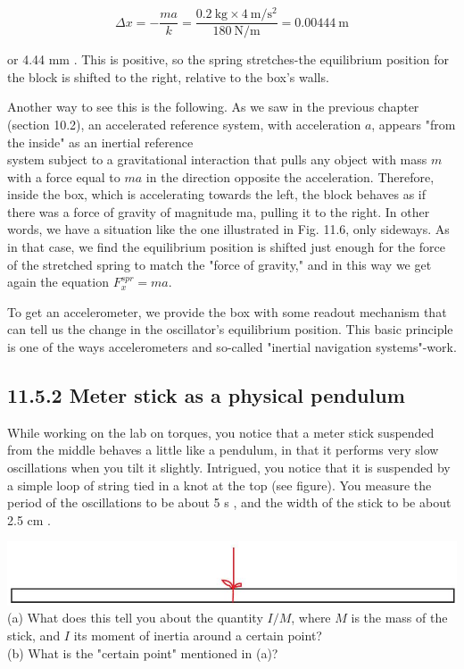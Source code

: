 \documentclass[10pt]{article}
\begin{document}
$$
\Delta x=-\frac{m a}{k}=\frac{0.2 \mathrm{~kg} \times 4 \mathrm{~m} / \mathrm{s}^{2}}{180 \mathrm{~N} / \mathrm{m}}=0.00444 \mathrm{~m}
$$

or 4.44 mm . This is positive, so the spring stretches-the equilibrium position for the block is shifted to the right, relative to the box's walls.

Another way to see this is the following. As we saw in the previous chapter (section 10.2), an accelerated reference system, with acceleration $a$, appears "from the inside" as an inertial reference\\
system subject to a gravitational interaction that pulls any object with mass $m$ with a force equal to $m a$ in the direction opposite the acceleration. Therefore, inside the box, which is accelerating towards the left, the block behaves as if there was a force of gravity of magnitude ma, pulling it to the right. In other words, we have a situation like the one illustrated in Fig. 11.6, only sideways. As in that case, we find the equilibrium position is shifted just enough for the force of the stretched spring to match the "force of gravity," and in this way we get again the equation $F_{x}^{s p r}=m a$.

To get an accelerometer, we provide the box with some readout mechanism that can tell us the change in the oscillator's equilibrium position. This basic principle is one of the ways accelerometers and so-called "inertial navigation systems"-work.

\subsection*{11.5.2 Meter stick as a physical pendulum}
While working on the lab on torques, you notice that a meter stick suspended from the middle behaves a little like a pendulum, in that it performs very slow oscillations when you tilt it slightly. Intrigued, you notice that it is suspended by a simple loop of string tied in a knot at the top (see figure). You measure the period of the oscillations to be about 5 s , and the width of the stick to be about 2.5 cm .

\includegraphics[max width=\textwidth, center]{2024_09_14_9969b06773f10b6936e8g-288}\\
(a) What does this tell you about the quantity $I / M$, where $M$ is the mass of the stick, and $I$ its moment of inertia around a certain point?\\
(b) What is the "certain point" mentioned in (a)?
\end{document}
